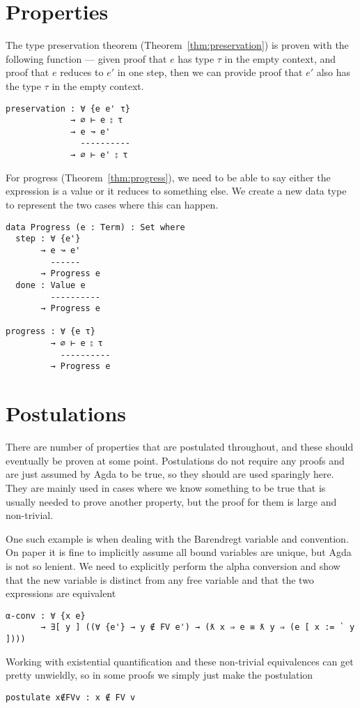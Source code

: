 \section{Properties}
The type preservation theorem (Theorem~\ref{thm:preservation}) is proven
with the following function --- given proof that $e$ has type $\tau$ in the
empty context, and proof that $e$ reduces to $e'$ in one step, then we
can provide proof that $e'$ also has the type $\tau$ in the empty context.
\begin{verbatim}
preservation : ∀ {e e' τ}
             → ∅ ⊢ e ⦂ τ
             → e ↝ e'
               ----------
             → ∅ ⊢ e' ⦂ τ
\end{verbatim}
For progress (Theorem~\ref{thm:progress}), we need to be able to say
either the expression is a value or it reduces to something else. We
create a new data type to represent the two cases where this can
happen.
\begin{verbatim}
data Progress (e : Term) : Set where
  step : ∀ {e'}
       → e ↝ e'
         ------
       → Progress e
  done : Value e
         ----------
       → Progress e

progress : ∀ {e τ}
         → ∅ ⊢ e ⦂ τ
           ----------
         → Progress e
\end{verbatim}

\section{Postulations}
There are number of properties that are postulated throughout, and
these should eventually be proven at some point. Postulations do not
require any proofs and are just assumed by Agda to be true, so they
should are used sparingly here. They are mainly used in cases where we
know something to be true that is usually needed to prove another
property, but the proof for them is large and non-trivial.

One such example is when dealing with the Barendregt variable and
convention. On paper it is fine to implicitly assume all bound
variables are unique, but Agda is not so lenient. We need to
explicitly perform the alpha conversion and show that the new variable
is distinct from any free variable and that the two expressions are
equivalent
\begin{verbatim}
α-conv : ∀ {x e}                                  
       → ∃[ y ] ((∀ {e'} → y ∉ FV e') → (ƛ x ⇒ e ≡ ƛ y ⇒ (e [ x := ` y ])))
\end{verbatim}
Working with existential quantification and these non-trivial
equivalences can get pretty unwieldly, so in some proofs we simply
just make the postulation
\begin{verbatim}
postulate x∉FVv : x ∉ FV v
\end{verbatim}

